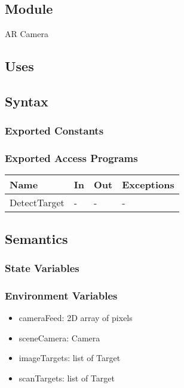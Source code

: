 \documentclass[12pt, titlepage]{article}
\begin{document}
\begin{itemize}
\subsection{Module}

AR Camera

\subsection{Uses}

\subsection{Syntax}

\subsubsection{Exported Constants}

\subsubsection{Exported Access Programs}

\begin{center}
\begin{tabular}{p{2cm} p{4cm} p{4cm} p{2cm}}
\hline
\textbf{Name} & \textbf{In} & \textbf{Out} & \textbf{Exceptions} \\
\hline
DetectTarget & - & - & - \\

\hline
\end{tabular}
\end{center}

\subsection{Semantics}

\subsubsection{State Variables}

\subsubsection{Environment Variables}

\begin{itemize}
\item cameraFeed: 2D array of pixels
\item sceneCamera: Camera
\item imageTargets: list of Target
\item scanTargets: list of Target
\end{itemize}



\end{itemize}
\end{document}
